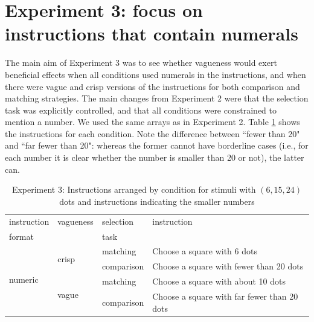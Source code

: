 \documentclass[%
man,		%
floatsintext,%
apacite%
]{apa6}
\begin{document}

\section{Experiment 3: focus on instructions that contain numerals}

The main aim of Experiment 3 was to see whether vagueness would exert beneficial effects when all conditions used numerals in the instructions, and when there were vague and crisp versions of the instructions for both comparison and matching strategies. The main changes from Experiment 2 were that the selection task was explicitly controlled, and that all conditions were constrained to mention a number. We used the same arrays as in Experiment 2. Table \ref{Instructions for e3} shows the instructions for each condition. Note the difference between ``fewer than 20" and ``far fewer than 20": whereas the former cannot have borderline cases (i.e., for each number it is clear whether the number is smaller than 20 or not), the latter can.


\begin{table}[htbp]
\centering
\caption{Experiment 3: Instructions arranged by condition for stimuli with $(6,15,24)$ dots and instructions indicating the smaller numbers} 
\label{Instructions for e3}
\begin{tabular}{llll}
instruction				&vagueness			&	selection		&	instruction							\\
format				&					&	task			&									\\
\toprule
\multirow{4}{*}{numeric}	&\multirow{2}{*}{crisp} 	&	matching		& Choose a square with 6 dots 				\\ 
					&					&	comparison 	& Choose a square with fewer than 20 dots 	\\
					\cline{2-4}
					&\multirow{2}{*}{vague} 	&	matching 		& Choose a square with about 10 dots 		\\ 
 					&					&	comparison 	& Choose a square with far fewer than 20 dots 	\\ 
\bottomrule
\end{tabular}
\end{table}%
\end{document}
